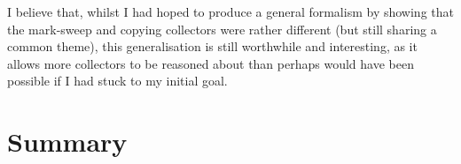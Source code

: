 I believe that, whilst I had hoped to produce a general formalism by
showing that the mark-sweep and copying collectors were rather
different (but still sharing a common theme), this generalisation is
still worthwhile and interesting, as it allows more collectors to be
reasoned about than perhaps would have been possible if I had stuck to
my initial goal.

\section{Summary}
\label{sec:results-summary}

